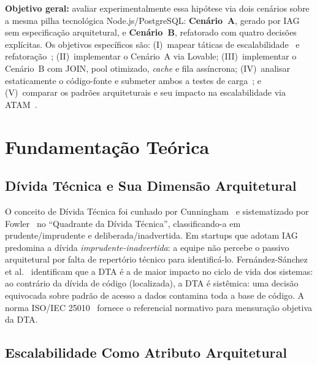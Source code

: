 \documentclass[sigconf]{acmart}
\begin{document}
\textbf{Objetivo geral:} avaliar experimentalmente essa hipótese via dois cenários
sobre a mesma pilha tecnológica Node.js/PostgreSQL: \textbf{Cenário~A}, gerado por IAG sem
especificação arquitetural, e \textbf{Cenário~B}, refatorado com quatro decisões
explícitas. Os objetivos específicos são: (I)~mapear táticas de
escalabilidade~\cite{Bass2021} e refatoração~\cite{Fowler2018};
(II)~implementar o Cenário~A via Lovable; (III)~implementar o Cenário~B com
JOIN, pool otimizado, \textit{cache} e fila assíncrona; (IV)~analisar estaticamente
o código-fonte e submeter ambos a testes de carga~\cite{grafana2024}; e
(V)~comparar os padrões arquiteturais e seu impacto na escalabilidade via
ATAM~\cite{Kazman2000}.

\section{Fundamentação Teórica}

\subsection{Dívida Técnica e Sua Dimensão Arquitetural}

O conceito de Dívida Técnica foi cunhado por Cunningham~\cite{Cunningham1992} e
sistematizado por Fowler~\cite{Fowler2018} no ``Quadrante da Dívida Técnica'',
classificando-a em prudente/imprudente e deliberada/inadvertida. Em startups que
adotam IAG predomina a dívida \textit{impru\-dente-ina\-dver\-tida}: a equipe não percebe
o passivo arquitetural por falta de repertório técnico para identificá-lo.
Fernández-Sánchez et al.~\cite{FernandezSanchez2020} identificam que a DTA é a de
maior impacto no ciclo de vida dos sistemas: ao contrário da dívida de código
(localizada), a DTA é sistêmica: uma decisão equivocada sobre padrão de acesso
a dados contamina toda a base de código. A norma ISO/IEC 25010~\cite{ISO25010}
fornece o referencial normativo para mensuração objetiva da DTA.

\subsection{Escalabilidade Como Atributo Arquitetural}
\end{document}
